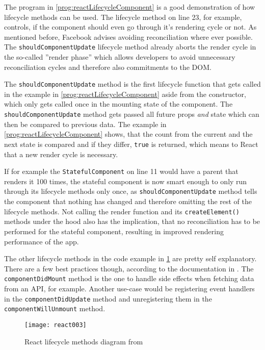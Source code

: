 The program in \ref{prog:reactLifecycleComponent} is a good demonstration of how lifecycle methods can be used. The lifecycle method on line 23, for example, controls, if the component should even go through it's rendering cycle or not. As mentioned before, Facebook advises avoiding reconciliation where ever possible. The \texttt{shouldComponentUpdate} lifecycle method already aborts the render cycle in the so-called ''render phase'' which allows developers to avoid unnecessary reconciliation cycles and therefore also commitments to the DOM. 

The \texttt{shouldComponentUpdate} method is the first lifecycle function that gets called in the example in \ref{prog:reactLifecycleComponent} aside from the constructor, which only gets called once in the mounting state of the component. The \texttt{shouldComponentUpdate} method gets passed all future props \emph{and} state which can then be compared to previous data. The example in \ref{prog:reactLifecycleComponent} shows, that the count from the current and the next state is compared and if they differ, \texttt{true} is returned, which means to React that a new render cycle is necessary. 

If for example the \texttt{StatefulComponent} on line 11 would have a parent that renders it 100 times, the stateful component is now smart enough to only run through its lifecycle methods only once, as \texttt{shouldComponentUpdate} method tells the component that nothing has changed and therefore omitting the rest of the lifecycle methods. Not calling the render function and its \texttt{createElement()} methods under the hood also has the implication, that no reconciliation has to be performed for the stateful component, resulting in improved rendering performance of the app.

The other lifecycle methods in the code example in \ref{fig:reactLifecycleMethods} are pretty self explanatory. There are a few best practices though, according to the documentation in \cite{React}. The \texttt{componentDidMount} method is the one to handle side effects when fetching data from an API, for example. Another use-case would be registering event handlers in the \texttt{componentDidUpdate} method and unregistering them in the \texttt{componentWillUnmount} method.

\begin{figure}
  \centering
  \texttt{[image: react003]}
  \caption{React lifecycle methods diagram from \cite{ReactRenderCycleGithub}}
  \label{fig:reactLifecycleMethods}
\end{figure}

